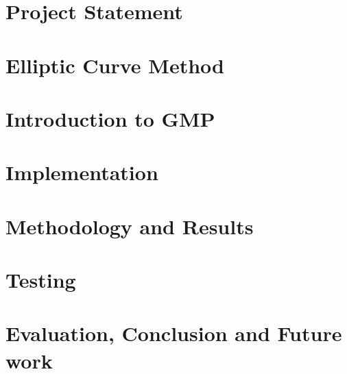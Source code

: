 \documentclass[onehalfspacing,final,12pt,a4paper,oneside]{YasarThesis}
\begin{document}
 
	\chapter{Project Statement}\label{ch:Statement}
	
	 
%	
	
	\chapter{Elliptic Curve Method}\label{ch:Elliptic}
	
	
	\chapter{Introduction to GMP}\label{ch:GMP}
	
	
	\chapter{Implementation}\label{ch:Implementation}
	

	\chapter{Methodology and Results}\label{ch:Methodology}
	

	\chapter{Testing}\label{ch:Testing}
	

	\chapter{Evaluation, Conclusion and Future work}\label{ch:Conclusion}
	
	
	\cite{*}
	
	\appendix
  	\chapter{~}
  	\vspace{-30mm}
	
	
	\backmatter{}
	
	
\end{document}
